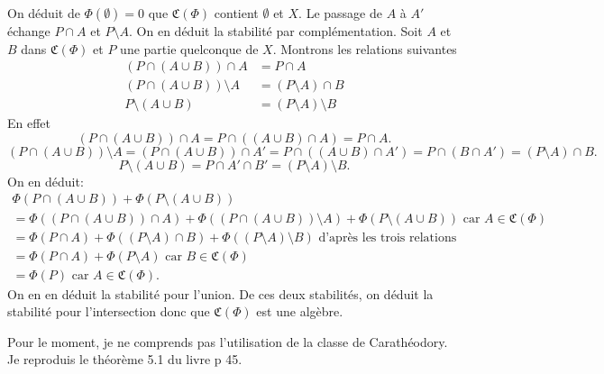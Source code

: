 \begin{demo}
On déduit de $\Phi(\emptyset) = 0$ que $\mathfrak{C}(\Phi)$ contient $\emptyset$ et $X$.\newline
Le passage de $A$ à $A'$ échange $P \cap A$ et $P \setminus A$. On en déduit la stabilité par complémentation.\newline
Soit $A$ et $B$ dans $\mathfrak{C}(\Phi)$ et $P$ une partie quelconque de $X$. Montrons les relations suivantes
\begin{align*}
  \left(P \cap (A \cup B)\right) \cap A &= P \cap A \\
  \left(P \cap (A \cup B)\right) \setminus A  &= (P \setminus A)\cap B \\
  P \setminus (A \cup B) &= (P \setminus A) \setminus B
\end{align*}
En effet
\begin{displaymath}
 \left(P \cap (A \cup B)\right) \cap A = P \cap \left( (A \cup B) \cap A \right)
 = P \cap A.
\end{displaymath}
\begin{displaymath}
 \left(P \cap (A \cup B)\right) \setminus A
 = \left(P \cap (A \cup B)\right) \cap A'
 = P \cap  \left( (A \cup B) \cap A' \right)
 = P \cap  \left( B \cap A' \right)
 = (P \setminus A) \cap B .
\end{displaymath}
\begin{displaymath}
 P \setminus (A \cup B)
 = P \cap A' \cap B' = (P \setminus A) \setminus B .
\end{displaymath}
On en déduit:
\begin{multline*}
 \Phi(P \cap (A \cup B)) + \Phi(P \setminus (A \cup B)) \\
  = \Phi((P \cap (A \cup B))\cap A ) + \Phi((P \cap (A \cup B))\setminus A ) + \Phi(P \setminus (A \cup B)) \text{ car } A \in \mathfrak{C}(\Phi) \\
  = \Phi(P \cap A) + \Phi((P \setminus A) \cap B)  + \Phi((P \setminus A) \setminus B) \text{ d'après les trois relations} \\
  = \Phi(P \cap A) + \Phi(P \setminus A)  \text{ car } B \in \mathfrak{C}(\Phi) \\
  = \Phi(P) \text{ car } A \in \mathfrak{C}(\Phi).
\end{multline*}
On en en déduit la stabilité pour l'union. De ces deux stabilités, on déduit la stabilité pour l'intersection donc que $\mathfrak{C}(\Phi)$ est une algèbre.
\end{demo}
Pour le moment, je ne comprends pas l'utilisation de la classe de Carathéodory. Je reproduis le théorème 5.1 du livre p 45.
